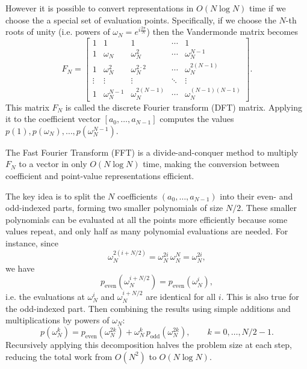 \documentclass[prb,preprint]{revtex4}
\begin{document}
However it is possible to convert representations in $O(N\log N)$ time if we choose the a special set of evaluation points. Specifically, if we choose the $N$-th roots of unity (i.e. powers of $\omega_N = e^{i\frac{2\pi}{N}}$) then the Vandermonde matrix becomes
\begin{equation}
F_N =
\begin{bmatrix}
	1 & 1 & 1 & \cdots & 1 \\
	1 & \omega_N & \omega_N^2 & \cdots & \omega_N^{N-1} \\
	1 & \omega_N^2 & \omega_N^{2\cdot 2} & \cdots & \omega_N^{2(N-1)} \\
	\vdots & \vdots & \vdots & \ddots & \vdots \\
	1 & \omega_N^{N-1} & \omega_N^{2(N-1)} & \cdots & \omega_N^{(N-1)(N-1)}
\end{bmatrix}.
\end{equation}
This matrix $F_N$ is called the discrete Fourier transform (DFT) matrix. Applying it to the coefficient vector $[a_0, \ldots, a_{N-1}]$ computes the values $p(1), p(\omega_N), \ldots, p(\omega_N^{N-1})$. 

The Fast Fourier Transform (FFT) is a divide-and-conquer method to multiply $F_N$ to a vector in only $O(N\log N)$ time, making the conversion between coefficient and point-value representations efficient.

	The key idea is to split the $N$ coefficients $(a_0, \ldots, a_{N-1})$ into their even- and odd-indexed parts, forming two smaller polynomials of size $N/2$. These smaller polynomials can be evaluated at all the points more efficiently because some values repeat, and only half as many polynomial evaluations are needed. For instance, since
	\[
	\omega_N^{2(i + N/2)} = \omega_N^{2i}\,\omega_N^{N} = \omega_N^{2i},
	\]
	we have
	\[
	p_{\text{even}}(\omega_N^{i + N/2}) = p_{\text{even}}(\omega_N^i),
	\]
	i.e. the evaluations at $\omega_N^i$ and $\omega_N^{i+N/2}$ are identical for all $i$. This is also true for the odd-indexed part. Then combining the results using simple additions and multiplications by powers of $\omega_N$:
	\begin{equation}
		p(\omega_N^k) = p_{\text{even}}(\omega_N^{2k}) + \omega_N^k\, p_{\text{odd}}(\omega_N^{2k}), \qquad k = 0, \ldots, N/2 - 1.
	\end{equation}
	Recursively applying this decomposition halves the problem size at each step, reducing the total work from $O(N^2)$ to $O(N\log N)$.
		
\end{document}
